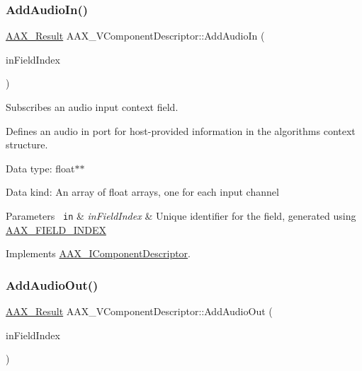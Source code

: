 \subsubsection{\texorpdfstring{AddAudioIn()}{AddAudioIn()}}
{\footnotesize\ttfamily \mbox{\hyperlink{a00392_a4d8f69a697df7f70c3a8e9b8ee130d2f}{A\+A\+X\+\_\+\+Result}} A\+A\+X\+\_\+\+V\+Component\+Descriptor\+::\+Add\+Audio\+In (\begin{DoxyParamCaption}\item[{\mbox{\hyperlink{a00392_ae807f8986143820cfb5d6da32165c9c7}{A\+A\+X\+\_\+\+C\+Field\+Index}}}]{in\+Field\+Index }\end{DoxyParamCaption})\hspace{0.3cm}{\ttfamily [virtual]}}



Subscribes an audio input context field. 

Defines an audio in port for host-\/provided information in the algorithm\textquotesingle{}s context structure.


\begin{DoxyItemize}
\item Data type\+: float$\ast$$\ast$
\item Data kind\+: An array of float arrays, one for each input channel
\end{DoxyItemize}


\begin{DoxyParams}[1]{Parameters}
\mbox{\texttt{ in}}  & {\em in\+Field\+Index} & Unique identifier for the field, generated using \mbox{\hyperlink{a00392_acf807247ecd6e5899dc9dc31644e9a1d}{A\+A\+X\+\_\+\+F\+I\+E\+L\+D\+\_\+\+I\+N\+D\+EX}} \\
\hline
\end{DoxyParams}


Implements \mbox{\hyperlink{a01781_a5fad32eff268756c9b4309431321f9b3}{A\+A\+X\+\_\+\+I\+Component\+Descriptor}}.

\mbox{\label{a01901_a08252ef7dc9aa763fcccfc527583c47f}} 
\subsubsection{\texorpdfstring{AddAudioOut()}{AddAudioOut()}}
{\footnotesize\ttfamily \mbox{\hyperlink{a00392_a4d8f69a697df7f70c3a8e9b8ee130d2f}{A\+A\+X\+\_\+\+Result}} A\+A\+X\+\_\+\+V\+Component\+Descriptor\+::\+Add\+Audio\+Out (\begin{DoxyParamCaption}\item[{\mbox{\hyperlink{a00392_ae807f8986143820cfb5d6da32165c9c7}{A\+A\+X\+\_\+\+C\+Field\+Index}}}]{in\+Field\+Index }\end{DoxyParamCaption})\hspace{0.3cm}{\ttfamily [virtual]}}



